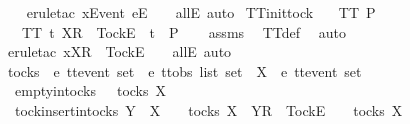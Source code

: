 \ \ \isamarkupfalse%
\ {\isacharparenleft}erule{\isacharunderscore}tac\ x{\isacharequal}{\isachardoublequoteopen}{\isacharbrackleft}Event\ e{\isacharbrackright}\isactrlsub E\ {\isacharhash}\ {\isasymrho}{\isachardoublequoteclose}\ \ allE{\isacharcomma}\ auto{\isacharparenright}%
\endisatagproof
{\isafoldproof}%
%
\isadelimproof
\isanewline
%
\endisadelimproof
\isanewline
{}\isamarkupfalse%
\ TT{}{\isacharunderscore}init{\isacharunderscore}tock{\isacharcolon}\isanewline
\ \ \ {\isachardoublequoteopen}TT{}\ P{\isachardoublequoteclose}\isanewline
\ \ \ {\isachardoublequoteopen}TT{}\ {\isacharbraceleft}t{\isachardot}\ {\isacharbrackleft}X{\isacharbrackright}\isactrlsub R\ {\isacharhash}\ {\isacharbrackleft}Tock{\isacharbrackright}\isactrlsub E\ {\isacharhash}\ t\ {\isasymin}\ P{\isacharbraceright}{\isachardoublequoteclose}\isanewline
%
\isadelimproof
\ \ %
\endisadelimproof
%
\isatagproof
{}\isamarkupfalse%
\ assms\ \isamarkupfalse%
\ TT{}{\isacharunderscore}def\ \isamarkupfalse%
\ {\isacharparenleft}auto{\isacharparenright}\isanewline
\ \ \isamarkupfalse%
\ {\isacharparenleft}erule{\isacharunderscore}tac\ x{\isacharequal}{\isachardoublequoteopen}{\isacharbrackleft}X{\isacharbrackright}\isactrlsub R\ {\isacharhash}\ {\isacharbrackleft}Tock{\isacharbrackright}\isactrlsub E\ {\isacharhash}\ {\isasymrho}{\isachardoublequoteclose}\ \ allE{\isacharcomma}\ auto{\isacharparenright}%
\endisatagproof
{\isafoldproof}%
%
\isadelimproof
%
\endisadelimproof
%
\isadelimdocument
%
\endisadelimdocument
%
\isatagdocument
%
\isamarkuptrue%
%
\endisatagdocument
{\isafolddocument}%
%
\isadelimdocument
%
\endisadelimdocument
{}\isamarkupfalse%
\ tocks\ {\isacharcolon}{\isacharcolon}\ {\isachardoublequoteopen}{\isacharprime}e\ ttevent\ set\ {\isasymRightarrow}\ {\isacharprime}e\ ttobs\ list\ set{\isachardoublequoteclose}\ \ X\ {\isacharcolon}{\isacharcolon}\ {\isachardoublequoteopen}{\isacharprime}e\ ttevent\ set{\isachardoublequoteclose}\ \isanewline
\ \ empty{\isacharunderscore}in{\isacharunderscore}tocks{\isacharcolon}\ {\isachardoublequoteopen}{\isacharbrackleft}{\isacharbrackright}\ {\isasymin}\ tocks\ X{\isachardoublequoteclose}\ {\isacharbar}\isanewline
\ \ tock{\isacharunderscore}insert{\isacharunderscore}in{\isacharunderscore}tocks{\isacharcolon}\ {\isachardoublequoteopen}Y\ {\isasymsubseteq}\ X\ {\isasymLongrightarrow}\ {\isasymrho}\ {\isasymin}\ tocks\ X\ {\isasymLongrightarrow}\ {\isacharbrackleft}Y{\isacharbrackright}\isactrlsub R\ {\isacharhash}\ {\isacharbrackleft}Tock{\isacharbrackright}\isactrlsub E\ {\isacharhash}\ {\isasymrho}\ {\isasymin}\ tocks\ X{\isachardoublequoteclose}\isanewline
